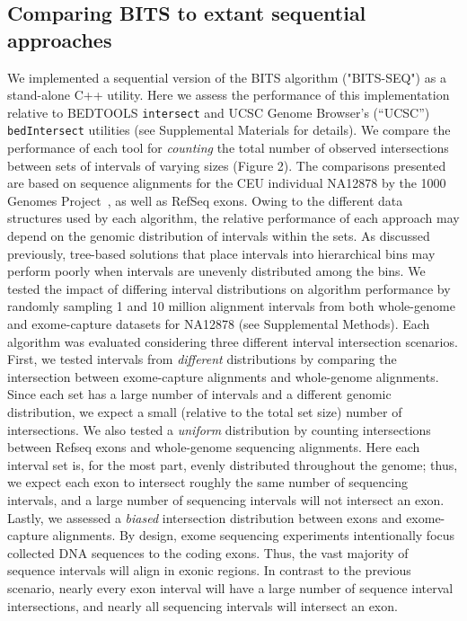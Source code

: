 \documentclass{bioinfo}
\begin{document}
\subsection{Comparing BITS to extant sequential approaches}
We implemented a sequential version of the BITS algorithm ("BITS-SEQ") as a 
stand-alone C++ utility. Here we assess the performance of this implementation 
relative to BEDTOOLS \texttt{intersect} and UCSC Genome Browser's (``UCSC'')
\citep{kent2002} \texttt{bedIntersect} utilities (see Supplemental Materials for
details).  We compare the performance of each tool for \emph{counting} the total
number of observed intersections between sets of intervals of varying sizes
(Figure 2). The comparisons presented are based on sequence alignments for the 
CEU individual NA12878 by the 1000 Genomes Project~\citep{durbin2010}, as well 
as RefSeq exons. Owing
to the different data structures used by each algorithm, the relative
performance of each approach may depend on the genomic distribution of intervals
within the sets. As discussed previously, tree-based solutions
that place intervals into hierarchical bins may perform poorly when intervals
are unevenly distributed among the bins. We tested the impact of differing
interval distributions on algorithm performance by randomly sampling 1 and 10
million alignment intervals from both whole-genome and exome-capture datasets
for NA12878 (see Supplemental Methods). Each algorithm was evaluated
considering three different interval intersection scenarios. First, we tested 
intervals from \emph{different} distributions by comparing the intersection 
between exome-capture alignments and whole-genome alignments. Since each set
has a large number of intervals and a different genomic 
distribution, we expect a small (relative to the total set size) number of 
intersections. We also tested a \emph{uniform} distribution by counting 
intersections between Refseq exons and whole-genome sequencing alignments.
Here each interval set is, for the most part, evenly distributed throughout
the genome; thus, we expect each exon to intersect roughly the same number
of sequencing intervals, and a large number of sequencing intervals will not
intersect an exon. Lastly, we assessed a \emph{biased} intersection
distribution between exons and exome-capture alignments. By design, 
exome sequencing experiments intentionally focus collected
DNA sequences to the coding exons. Thus, the vast majority of sequence intervals 
will align in exonic regions. In contrast to the previous scenario, nearly every 
exon interval will have a large number of sequence interval intersections, and 
nearly all sequencing intervals will intersect an exon.
\end{document}
